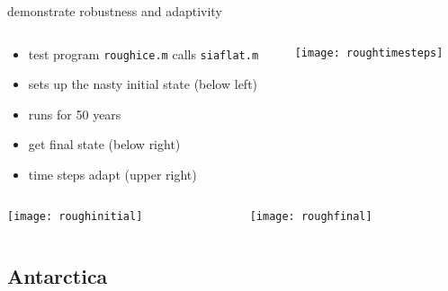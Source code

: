 \begin{frame}{demonstrate robustness and adaptivity}

\begin{columns}
\begin{column}{0.6\textwidth}
\small
\begin{itemize}
\item test program \texttt{roughice.m} calls \texttt{siaflat.m}
\item sets up the nasty initial state (below left)
\item runs for 50 years
\item get final state (below right)
\item time steps adapt (upper right)
\end{itemize}
\end{column}
\begin{column}{0.4\textwidth}
\texttt{[image: roughtimesteps]}
\end{column}
\end{columns}

\bigskip
\begin{columns}
\begin{column}{0.5\textwidth}
\texttt{[image: roughinitial]}
\end{column}
\begin{column}{0.5\textwidth}
\texttt{[image: roughfinal]}
\end{column}
\end{columns}
\end{frame}


\subsection{Antarctica}

